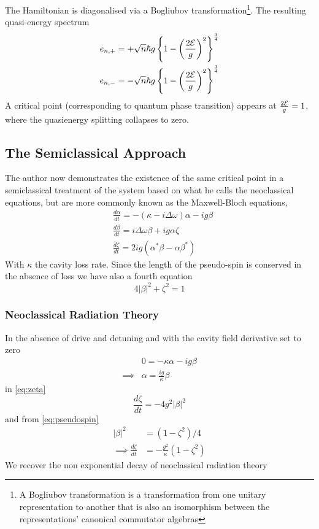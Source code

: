 The Hamiltonian is diagonalised via a Bogliubov transformation\footnote{A Bogliubov transformation is a transformation from one unitary representation to another that is also an isomorphism between the representations' canonical commutator algebras}. The resulting quasi-energy spectrum
\begin{align}
	e_{n, +} &= + \sqrt{n} \hbar g \left \{1 - \left ({\frac{2\mathcal{E}}{g}} \right )^2 \right \}^{\frac{3}{4}} \\
	e_{n, -} &= - \sqrt{n} \hbar g \left \{1 - \left ({\frac{2\mathcal{E}}{g}} \right )^2 \right \}^{\frac{3}{4}}
\end{align}
A critical point (corresponding to quantum phase transition) appears at $\frac{2\mathcal{E}}{g} = 1$, where the quasienergy splitting collapses to zero.
\subsection{The Semiclassical Approach}

The author now demonstrates the existence of the same critical point in a semiclassical treatment of the system based on what he calls the neoclassical equations, but are more commonly known as the Maxwell-Bloch equations,
\begin{align}
	&\frac{d \alpha}{dt} = -(\kappa -i \Delta \omega) \alpha-ig \beta \label{eq:alpha}\\
	&\frac{d \beta}{dt} = i \Delta \omega \beta +ig \alpha \zeta \label{eq:beta}\\
	&\frac{d \zeta}{dt} = 2 i g(\alpha^* \beta -\alpha \beta^*)\label{eq:zeta}
\end{align}
With $\kappa$ the cavity loss rate. Since the length of the pseudo-spin is conserved in the absence of loss we have also a fourth equation
\begin{equation}
	4|\beta|^2+\zeta^2 = 1 \label{eq:pseudospin}
\end{equation}
\subsubsection{Neoclassical Radiation Theory}
In the absence of drive and detuning and with the cavity field derivative set to zero
\begin{align}
	& 0 = -\kappa \alpha - ig \beta \\
	\implies & \alpha = \frac{ig}{\kappa} \beta
\end{align}
in \cref{eq:zeta}
\begin{equation}
	\frac{d \zeta}{dt} = -4 g^2 |\beta|^2
\end{equation}
and from \cref{eq:pseudospin}
\begin{align}
	 |\beta|^2 &= (1-\zeta^2)/4 \\
\implies \frac{d \zeta}{dt} &= -\frac{g^2}{\kappa} (1-\zeta^2)
\end{align}
We recover the non exponential decay of neoclassical radiation theory
